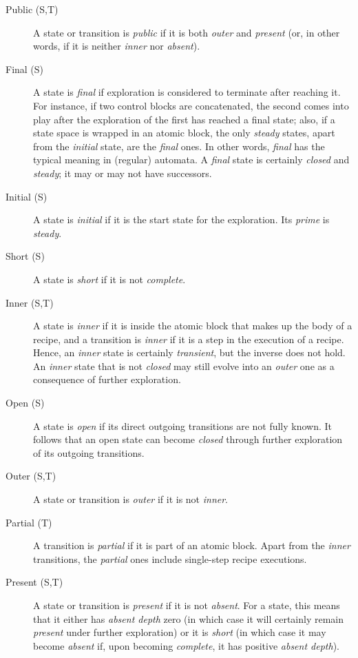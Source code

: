 \documentclass{article}
\begin{document}
\begin{description}
\item[Public (S,T)] A state or transition is \emph{public} if it is both \emph{outer} and \emph{present} (or, in other words, if it is neither \emph{inner} nor \emph{absent}).

\item[Final (S)] A state is \emph{final} if exploration is considered to terminate after reaching it. For instance, if two control blocks are concatenated, the second comes into play after the exploration of the first has reached a final state; also, if a state space is wrapped in an atomic block, the only \emph{steady} states, apart from the \emph{initial} state, are the \emph{final} ones. In other words, \emph{final} has the typical meaning in (regular) automata. A \emph{final} state is certainly \emph{closed} and \emph{steady}; it may or may not have successors.

\item[Initial (S)] A state is \emph{initial} if it is the start state for the exploration. Its \emph{prime} is \emph{steady}.

\item[Short (S)] A state is \emph{short} if it is not \emph{complete}.

\item[Inner (S,T)] A state is \emph{inner} if it is inside the atomic block that makes up the body of a recipe, and a transition is \emph{inner} if it is a step in the execution of a recipe. Hence, an \emph{inner} state is certainly \emph{transient}, but the inverse does not hold. An \emph{inner} state that is not \emph{closed} may still evolve into an \emph{outer} one as a consequence of further exploration.

\item[Open (S)] A state is \emph{open} if its direct outgoing transitions are not fully known. It follows that an open state can become \emph{closed} through further exploration of its outgoing transitions.

\item[Outer (S,T)] A state or transition is \emph{outer} if it is not \emph{inner}.

\item[Partial (T)] A transition is \emph{partial} if it is part of an atomic block. Apart from the \emph{inner} transitions, the \emph{partial} ones include single-step recipe executions.

\item[Present (S,T)] A state or transition is \emph{present} if it is not \emph{absent}. For a state, this means that it either has \emph{absent depth} zero (in which case it will certainly remain \emph{present} under further exploration) or it is \emph{short} (in which case it may become \emph{absent} if, upon becoming \emph{complete}, it has positive \emph{absent depth}).


\end{description}
\end{document}
